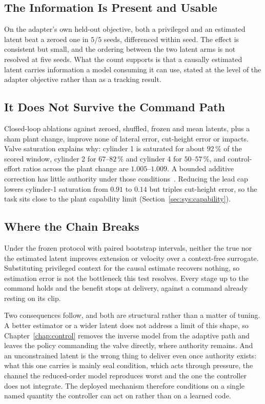 \subsection{The Information Is Present and Usable}
\label{sec:models:adapter-openloop}

On the adapter's own held-out objective, both a privileged and an estimated
latent beat a zeroed one in $5/5$ seeds, differenced within seed. The effect is
consistent but small, and the ordering between the two latent arms is not
resolved at five seeds. What the count supports is that a causally estimated
latent carries information a model consuming it can use, stated at the level of
the adapter objective rather than as a tracking result.

\subsection{It Does Not Survive the Command Path}
\label{sec:models:adapter-null}

Closed-loop ablations against zeroed, shuffled, frozen and mean latents, plus a
sham plant change, improve none of lateral error, cut-height error or impacts.
Valve saturation explains why: cylinder 1 is saturated for about $92\,\%$ of the
scored window, cylinder 2 for $67$--$82\,\%$ and cylinder 4 for $50$--$57\,\%$,
and control-effort ratios across the plant change are $1.005$--$1.009$. A
bounded additive correction has little authority under those
conditions~\cite{sofrony2024antiwindup}. Reducing the lead cap lowers
cylinder-1 saturation from $0.91$ to $0.14$ but triples cut-height error, so the
task sits close to the plant capability limit
(Section~\ref{sec:sys:capability}).

\subsection{Where the Chain Breaks}
\label{sec:models:chain}

Under the frozen protocol with paired bootstrap intervals, neither the true nor
the estimated latent improves extension or velocity over a context-free
surrogate. Substituting privileged context for the causal estimate recovers
nothing, so estimation error is not the bottleneck this test resolves. Every
stage up to the command holds and the benefit stops at delivery, against a
command already resting on its clip.

Two consequences follow, and both are structural rather than a matter of tuning.
A better estimator or a wider latent does not address a limit of this shape, so
Chapter~\ref{chap:control} removes the inverse model from the adaptive path and
leaves the policy commanding the valve directly, where authority remains. And an
unconstrained latent is the wrong thing to deliver even once authority exists:
what this one carries is mainly seal condition, which acts through pressure, the
channel the reduced-order model reproduces worst and the one the controller does
not integrate. The deployed mechanism therefore conditions on a single named
quantity the controller can act on rather than on a learned code.

